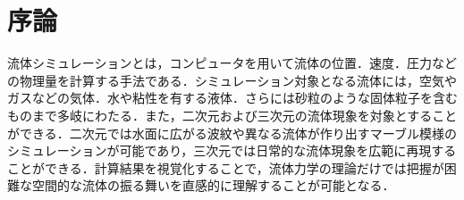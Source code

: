 \documentclass[a4j,12pt]{jreport}
\begin{document}
\chapter{序論} \label{chapter:1}





流体シミュレーションとは，コンピュータを用いて流体の位置．速度．圧力などの物理量を計算する手法である．シミュレーション対象となる流体には，空気やガスなどの気体．水や粘性を有する液体．さらには砂粒のような固体粒子を含むものまで多岐にわたる．また，二次元および三次元の流体現象を対象とすることができる．二次元では水面に広がる波紋や異なる流体が作り出すマーブル模様のシミュレーションが可能であり，三次元では日常的な流体現象を広範に再現することができる．計算結果を視覚化することで，流体力学の理論だけでは把握が困難な空間的な流体の振る舞いを直感的に理解することが可能となる．
\end{document}
